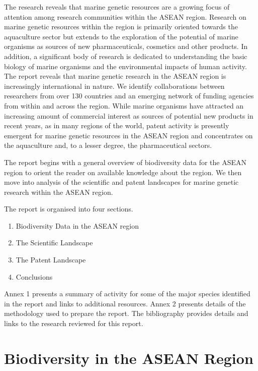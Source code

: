 \documentclass[]{book}
\providecommand{\tightlist}{%
  \setlength{\itemsep}{0pt}\setlength{\parskip}{0pt}}
\theoremstyle{definition}
\theoremstyle{definition}
\theoremstyle{definition}
\theoremstyle{remark}
\begin{document}
The research reveals that marine genetic resources are a growing focus
of attention among research communities within the ASEAN region.
Research on marine genetic resources within the region is primarily
oriented towards the aquaculture sector but extends to the exploration
of the potential of marine organisms as sources of new pharmaceuticals,
cosmetics and other products. In addition, a significant body of
research is dedicated to understanding the basic biology of marine
organisms and the environmental impacts of human activity. The report
reveals that marine genetic research in the ASEAN region is increasingly
international in nature. We identify collaborations between researchers
from over 130 countries and an emerging network of funding agencies from
within and across the region. While marine organisms have attracted an
increasing amount of commercial interest as sources of potential new
products in recent years, as in many regions of the world, patent
activity is presently emergent for marine genetic resources in the ASEAN
region and concentrates on the aquaculture and, to a lesser degree, the
pharmaceutical sectors.

The report begins with a general overview of biodiversity data for the
ASEAN region to orient the reader on available knowledge about the
region. We then move into analysis of the scientific and patent
landscapes for marine genetic research within the ASEAN region.

The report is organised into four sections.

\begin{enumerate}
\def\labelenumi{\arabic{enumi}.}
\tightlist
\item
  Biodiversity Data in the ASEAN region
\item
  The Scientific Landscape
\item
  The Patent Landscape
\item
  Conclusions
\end{enumerate}

Annex 1 presents a summary of activity for some of the major species
identified in the report and links to additional resources. Annex 2
presents details of the methodology used to prepare the report. The
bibliography provides details and links to the research reviewed for
this report.

\hypertarget{biodiversity}{%
\chapter{Biodiversity in the ASEAN Region}\label{biodiversity}}
\end{document}
